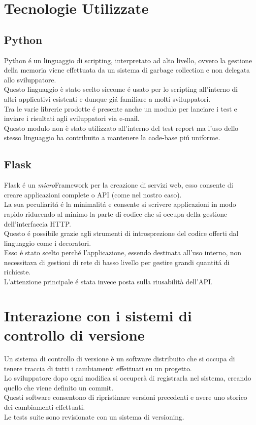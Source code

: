     \section{Tecnologie Utilizzate}  
        \subsection{Python}
            Python \'e un linguaggio di scripting, interpretato ad alto livello, ovvero la gestione della memoria viene effettuata da un sistema di garbage collection e non delegata allo sviluppatore.\\
            Questo linguaggio è stato scelto siccome \'e usato per lo scripting all'interno di altri applicativi esistenti e dunque gi\'a familiare a molti sviluppatori.\\
            
            Tra le varie librerie prodotte \'e presente anche un modulo per lanciare i test e inviare i risultati agli sviluppatori via e-mail.\\
            Questo modulo non è stato utilizzato all'interno del test report ma l'uso dello stesso linguaggio ha contribuito a mantenere la code-base pi\'u uniforme.
        \subsection{Flask}  
            Flask \'e un \textit{micro}Framework per la creazione di servizi web, esso consente di creare applicazioni complete o API (come nel nostro caso).\\
            La sua peculiarit\'a \'e la minimalit\'a e consente si scrivere applicazioni in modo rapido riducendo al minimo la parte di codice che si occupa della gestione dell'interfaccia HTTP.\\
            Questo \'e possibile grazie agli strumenti di introsprezione del codice offerti dal linguaggio come i decoratori.\\

            Esso \'e stato scelto perch\'e l'applicazione, essendo destinata all'uso interno, non necessitava di gestioni di rete di basso livello per gestire grandi quantit\'a di richieste.\\
            L'attenzione principale \'e stata invece posta sulla riusabilità dell'API.

    \section{Interazione con i sistemi di controllo di versione}           
        Un sistema di controllo di versione è un software distribuito che si occupa di tenere traccia di tutti i cambiamenti effettuati su un progetto.\\
        Lo sviluppatore dopo ogni modifica si occuperà di registrarla nel sistema, creando quello che viene definito un commit.\\
        Questi software consentono di ripristinare versioni precedenti e avere uno storico dei cambiamenti effettuati.\\
        Le tests suite sono revisionate con un sistema di versioning.\\
        
